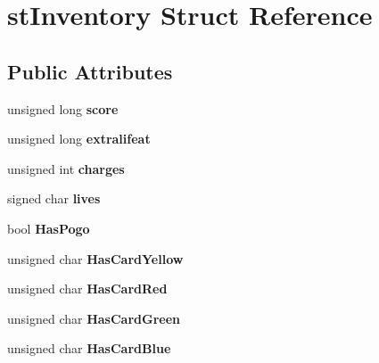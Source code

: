 \hypertarget{structst_inventory}{
\section{stInventory Struct Reference}
\label{structst_inventory}
}
\subsection*{Public Attributes}
\begin{DoxyCompactItemize}
\item 
\hypertarget{structst_inventory_add2f3edbd6ee2935e9a9ae38df21ee45}{
unsigned long {\bfseries score}}
\label{structst_inventory_add2f3edbd6ee2935e9a9ae38df21ee45}

\item 
\hypertarget{structst_inventory_ab8d735a2a1731909b7c570bab020b4b6}{
unsigned long {\bfseries extralifeat}}
\label{structst_inventory_ab8d735a2a1731909b7c570bab020b4b6}

\item 
\hypertarget{structst_inventory_a3544a6bdbd9daf888c251280342da784}{
unsigned int {\bfseries charges}}
\label{structst_inventory_a3544a6bdbd9daf888c251280342da784}

\item 
\hypertarget{structst_inventory_a4409b55395044cbb65aa9182a7ba1427}{
signed char {\bfseries lives}}
\label{structst_inventory_a4409b55395044cbb65aa9182a7ba1427}

\item 
\hypertarget{structst_inventory_acfa682fab327a645625e7e4bc7718696}{
bool {\bfseries HasPogo}}
\label{structst_inventory_acfa682fab327a645625e7e4bc7718696}

\item 
\hypertarget{structst_inventory_a19c55e4b9938764f5b3612a6344199b4}{
unsigned char {\bfseries HasCardYellow}}
\label{structst_inventory_a19c55e4b9938764f5b3612a6344199b4}

\item 
\hypertarget{structst_inventory_a3cb9190444ff16866a2408adbc5843a1}{
unsigned char {\bfseries HasCardRed}}
\label{structst_inventory_a3cb9190444ff16866a2408adbc5843a1}

\item 
\hypertarget{structst_inventory_aa75bbb9270b40992f8bd19dbed6db762}{
unsigned char {\bfseries HasCardGreen}}
\label{structst_inventory_aa75bbb9270b40992f8bd19dbed6db762}

\item 
\hypertarget{structst_inventory_a09b9ff06fa6592bfa5b1b3a21a1895d6}{
unsigned char {\bfseries HasCardBlue}}
\label{structst_inventory_a09b9ff06fa6592bfa5b1b3a21a1895d6}


\end{DoxyCompactItemize}
